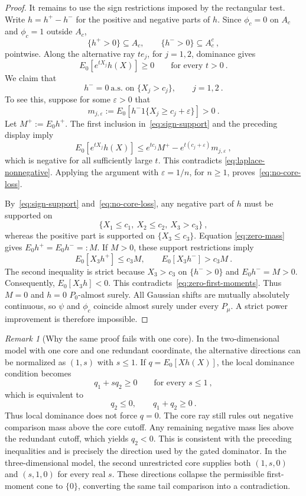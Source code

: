 \documentclass[12pt]{article}
\theoremstyle{remark}
\newtheorem{remark}{Remark}
\begin{document}
\begin{proof}
It remains to use the sign restrictions imposed by the rectangular test.
Write $h=h^+-h^-$ for the positive and negative parts of $h$.  Since
$\phi_c=0$ on $A_c$ and $\phi_c=1$ outside $A_c$,
\begin{equation}\label{eq:sign-support}
\{h^+>0\}\subseteq A_c,
\qquad
\{h^->0\}\subseteq A_c^c~,
\end{equation}
pointwise.  Along the alternative ray $t e_j$, for $j=1,2$, dominance
gives
\begin{equation}\label{eq:laplace-nonnegative}
E_0\!\left[e^{tX_j}h(X)\right]\ge0
\qquad\text{for every }t>0~.
\end{equation}
We claim that
\begin{equation}\label{eq:no-core-loss}
h^-=0\ \text{a.s. on }\{X_j>c_j\},
\qquad j=1,2~.
\end{equation}
To see this, suppose for some $\varepsilon>0$ that
\[
m_{j,\varepsilon}
:=
E_0\!\left[h^-1\{X_j\ge c_j+\varepsilon\}\right]>0~.
\]
Let $M^+:=E_0h^+$.  The first inclusion in~\eqref{eq:sign-support} and
the preceding display imply
\[
E_0\!\left[e^{tX_j}h(X)\right]
\le
e^{tc_j}M^+
-e^{t(c_j+\varepsilon)}m_{j,\varepsilon}~,
\]
which is negative for all sufficiently large $t$.  This contradicts
\eqref{eq:laplace-nonnegative}.  Applying the argument with
$\varepsilon=1/n$, for $n\ge1$, proves~\eqref{eq:no-core-loss}.

By~\eqref{eq:sign-support} and~\eqref{eq:no-core-loss}, any negative part of
$h$ must be supported on
\[
\{X_1\le c_1,\ X_2\le c_2,\ X_3>c_3\}~,
\]
whereas the positive part is supported on $\{X_3\le c_3\}$.  Equation
\eqref{eq:zero-mass} gives $E_0h^+=E_0h^-=:M$.  If $M>0$, these support
restrictions imply
\[
E_0[X_3h^+]\le c_3M,
\qquad
E_0[X_3h^-]>c_3M~.
\]
The second inequality is strict because $X_3>c_3$ on $\{h^->0\}$ and
$E_0h^-=M>0$.  Consequently, $E_0[X_3h]<0$.
This contradicts~\eqref{eq:zero-first-moments}.  Thus $M=0$ and $h=0$
$P_0$-almost surely.  All Gaussian shifts are mutually absolutely continuous,
so $\psi$ and $\phi_c$ coincide almost surely under every $P_\mu$.  A strict
power improvement is therefore impossible.
\end{proof}

\begin{remark}[Why the same proof fails with one core]
In the two-dimensional model with one core and one redundant coordinate, the
alternative directions can be normalized as $(1,s)$ with $s\le1$.  If
$q=E_0[Xh(X)]$, the local dominance condition becomes
\[
q_1+s q_2\ge0
\qquad\text{for every }s\le1~,
\]
which is equivalent to
\[
q_2\le0,
\qquad
q_1+q_2\ge0~.
\]
Thus local dominance does not force $q=0$.  The core ray still rules out
negative comparison mass above the core cutoff.  Any remaining negative mass
lies above the redundant cutoff, which yields $q_2<0$.  This is consistent
with the preceding inequalities and is precisely the direction used by the
gated dominator.  In the three-dimensional model, the second unrestricted
core supplies both $(1,s,0)$ and $(s,1,0)$ for every real $s$.  These
directions collapse the permissible first-moment cone to $\{0\}$, converting
the same tail comparison into a contradiction.
\end{remark}
\end{document}

